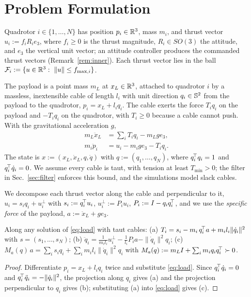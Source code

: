 \section{Problem Formulation}\label{sec:problem}

Quadrotor $i\in\{1,\dots,N\}$ has position $p_i\in\mathbb{R}^3$, mass $m_i$, and thrust vector $u_i:=f_iR_ie_3$, where $f_i\ge0$ is the thrust magnitude, $R_i\in SO(3)$ the attitude, and $e_3$ the vertical unit vector; an attitude controller produces the commanded thrust vectors (Remark~\ref{rem:inner}). Each thrust vector lies in the ball $\mathcal{F}_i:=\{u\in\mathbb{R}^3:\ \|u\|\le f_{\max,i}\}$.

The payload is a point mass $m_L$ at $x_L\in\mathbb{R}^3$, attached to quadrotor $i$ by a massless, inextensible cable of length $l_i$ with unit direction $q_i\in\mathbb{S}^{2}$ from the payload to the quadrotor, $p_i=x_L+l_iq_i$. The cable exerts the force $T_iq_i$ on the payload and $-T_iq_i$ on the quadrotor, with $T_i\ge0$ because a cable cannot push. With the gravitational acceleration $g$,
\begin{align}
m_L\ddot x_L &= \textstyle\sum_{i} T_i q_i - m_L g e_3, \label{eq:load}\\
m_i\ddot p_i &= u_i - m_i g e_3 - T_i q_i. \label{eq:veh}
\end{align}
The state is $x:=(x_L,\dot x_L,q,\dot q)$ with $q:=(q_1,\dots,q_N)$, where $q_i^{\!\top} q_i=1$ and $q_i^{\!\top}\dot q_i=0$. We assume every cable is taut, with tension at least $T_{\min}>0$; the filter in Sec.~\ref{sec:filter} enforces this bound, and the simulations model slack cables.

We decompose each thrust vector along the cable and perpendicular to it, $u_i=s_iq_i+u_i^{\perp}$ with $s_i:=q_i^{\!\top} u_i$, $u_i^\perp:=P_iu_i$, $P_i:=I-q_iq_i^{\!\top}$, and we use the \emph{specific force} of the payload, $a:=\ddot x_L+ge_3$.

\begin{lemma}[Structure]\label{lem:structure}
Along any solution of \eqref{eq:load} with taut cables:
(a) $T_i = s_i - m_i\,q_i^{\!\top} a + m_i l_i\|\dot q_i\|^2$ with $s=(s_1,\dots,s_N)$;
(b) $\ddot q_i = \tfrac{1}{m_il_i}u_i^\perp - \tfrac{1}{l_i}P_i a - \|\dot q_i\|^2 q_i$;
(c) $M_a(q)\,a=\sum_i s_iq_i+\sum_i m_il_i\|\dot q_i\|^2q_i$ with $M_a(q):=m_LI+\sum_i m_iq_iq_i^{\!\top}\succ0$.
\end{lemma}
\begin{proof}
Differentiate $p_i=x_L+l_iq_i$ twice and substitute \eqref{eq:load}. Since $q_i^{\!\top}\dot q_i=0$ and $q_i^{\!\top}\ddot q_i=-\|\dot q_i\|^2$, the projection along $q_i$ gives (a) and the projection perpendicular to $q_i$ gives (b); substituting (a) into \eqref{eq:load} gives (c).
\end{proof}

